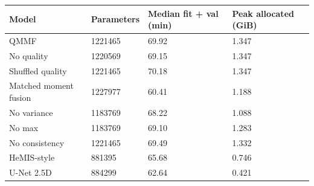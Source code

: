 \begin{tabular}{llll}
\toprule
Model & Parameters & Median fit + val (min) & Peak allocated (GiB) \\
\midrule
QMMF & 1221465 & 69.92 & 1.347 \\
No quality & 1220569 & 69.15 & 1.347 \\
Shuffled quality & 1221465 & 70.18 & 1.347 \\
Matched moment fusion & 1227977 & 60.41 & 1.188 \\
No variance & 1183769 & 68.22 & 1.088 \\
No max & 1183769 & 69.10 & 1.283 \\
No consistency & 1221465 & 69.49 & 1.332 \\
HeMIS-style & 881395 & 65.68 & 0.746 \\
U-Net 2.5D & 884299 & 62.64 & 0.421 \\
\bottomrule
\end{tabular}
